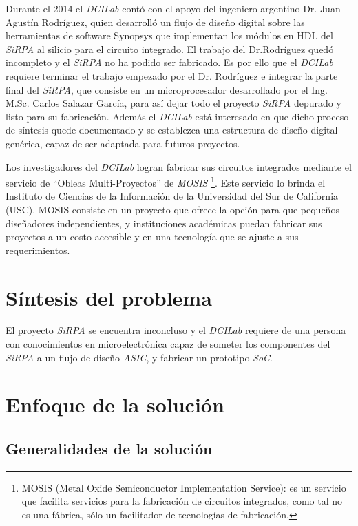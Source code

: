 Durante el 2014 el \textit{DCILab} contó con el apoyo del ingeniero argentino Dr. Juan Agustín Rodríguez, quien desarrolló un flujo de diseño digital sobre las herramientas de software Synopsys que implementan los módulos en HDL del \textit{SiRPA} al silicio para el circuito integrado. El trabajo del Dr.Rodríguez quedó incompleto y el \textit{SiRPA} no ha podido ser fabricado. Es por ello que el \textit{DCILab} requiere terminar el trabajo empezado por el Dr. Rodríguez e integrar la parte final del \textit{SiRPA}, que consiste en un microprocesador desarrollado por el Ing. M.Sc. Carlos Salazar García, para así dejar todo el proyecto \textit{SiRPA} depurado y listo para su fabricación. Además el \textit{DCILab} está interesado en que dicho proceso de síntesis quede documentado y se establezca una estructura de diseño digital genérica, capaz de ser adaptada para futuros proyectos.

Los investigadores del \textit{DCILab} logran fabricar sus circuitos integrados mediante el servicio de
“Obleas Multi-Proyectos” de \textit{MOSIS} \footnote{MOSIS (Metal Oxide Semiconductor Implementation Service): es un servicio que facilita servicios para la fabricación de circuitos integrados, como tal no es una fábrica, sólo un facilitador de tecnologías de fabricación.}. Este servicio lo brinda el Instituto de Ciencias de la
Información de la Universidad del Sur de California (USC). MOSIS consiste en un proyecto que ofrece
la opción para que pequeños diseñadores independientes, y instituciones académicas puedan fabricar
sus proyectos a un costo accesible y en una tecnología que se ajuste a sus requerimientos. \cite{website:mosis}

\section{Síntesis del problema}
El proyecto \textit{SiRPA} se encuentra inconcluso y el \textit{DCILab} requiere de una persona con conocimientos en microelectrónica capaz de someter los componentes del \textit{SiRPA} a un flujo de diseño \textit{ASIC}, y fabricar un prototipo \textit{SoC}.

\section{Enfoque de la solución}

\subsection{Generalidades de la solución}

